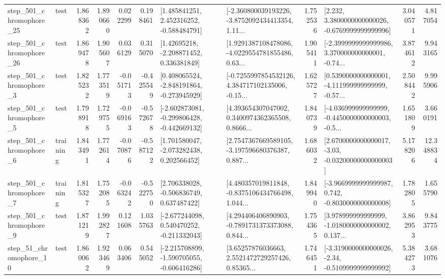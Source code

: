 \begin{tabular}{llrrrrllrlrr}
  step\_501\_chromophore\_25 &      test &      1.868362 &    1.890660 &      0.022299 &  0.198461 &    [1.485841251, 2.452316252, -0.588484791] &  [-2.360800039193226, -3.8752092434413354, 1.11... &       1.752536 &   [2.232, 3.3800000000000026, -0.6769999999999996] &            3.040571 &          4.817054 \\
  step\_501\_chromophore\_26 &      test &      1.869478 &    1.905607 &      0.036129 &  0.315070 &     [1.42695218, -2.208871452, 0.336381849] &  [1.9291387108478086, -4.0229554781855486, 0.63... &       1.905411 &  [-2.3999999999999986, 3.370000000000001, -0.74... &            3.874612 &          9.943165 \\
   step\_501\_chromophore\_3 &      test &      1.825232 &    1.773519 &     -0.051713 & -0.425549 &   [0.408065524, -2.848191864, -0.273945929] &  [-0.7255997854532126, 4.384717102135006, -0.15... &       1.625727 &  [0.5390000000000001, -4.111999999999999, -0.57... &            2.508442 &          9.995906 \\
   step\_501\_chromophore\_5 &      test &      1.798918 &    1.729755 &     -0.069163 & -0.572678 &  [-2.602873081, -0.299806428, -0.442669132] &  [4.393654307047002, 0.3400974362365508, 0.8666... &       1.840739 &  [-4.036999999999999, -0.4450000000000003, -0.5... &            1.651809 &          3.660191 \\
   step\_501\_chromophore\_6 &  training &      1.843491 &    1.772614 &     -0.070876 & -0.587122 &    [1.701580047, -2.073282438, 0.202566452] &  [2.7547367669589105, -3.197596680376387, 0.887... &       1.686032 &  [2.6700000000000017, -3.03, -0.03200000000000003] &            5.178206 &         12.348834 \\
   step\_501\_chromophore\_7 &  training &      1.815327 &    1.752085 &     -0.063242 & -0.522750 &    [2.706338028, -0.506836749, 0.637487422] &  [4.480357019811848, -0.8375106434766498, 1.044... &       1.849940 &  [-3.9669999999999987, 0.742, -0.8030000000000008] &            1.782805 &          1.655790 \\
   step\_501\_chromophore\_9 &      test &      1.871219 &    1.992827 &      0.121608 &  1.035763 &   [-2.677244098, 0.540470252, -0.211332043] &  [4.294406406890903, -0.7891731373373088, 0.844... &       1.754365 &  [3.978999999999999, -1.0180000000000002, 0.137... &            3.862953 &          9.843775 \\
   step\_51\_chromophore\_10 &      test &      1.860062 &    1.923469 &      0.063406 &  0.545052 &  [-2.215708899, -1.590705055, -0.606416286] &  [3.65257876036663, 2.5521472729257426, 0.85365... &       1.746451 &  [-3.3190000000000026, -2.34, -0.5109999999999992] &            5.384273 &          3.681076 \\

\end{tabular}
